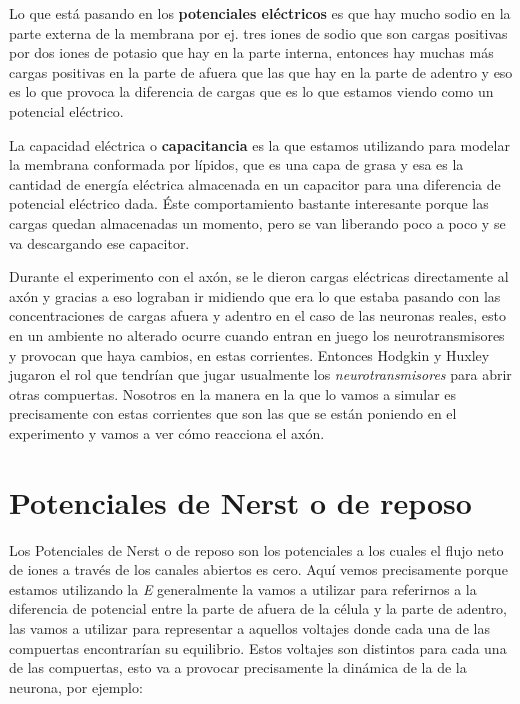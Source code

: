 Lo que está pasando en los \textbf{potenciales eléctricos} es que hay mucho sodio en la parte externa de la membrana por ej. tres iones de sodio que son cargas positivas por dos iones de potasio que hay en la parte interna, entonces hay muchas más cargas positivas en la parte de afuera que las que hay en la parte de adentro y eso es lo que provoca la diferencia de cargas que es lo que estamos viendo como un potencial eléctrico.


La capacidad eléctrica o \textbf{capacitancia} es la que estamos utilizando para modelar la membrana conformada por lípidos, que es una capa de grasa y esa es la cantidad de energía eléctrica almacenada en un capacitor para una diferencia de potencial eléctrico dada. Éste comportamiento bastante interesante porque las cargas quedan almacenadas un momento, pero se van liberando poco a poco y se va descargando ese capacitor. 


Durante el experimento con el axón, se le dieron cargas eléctricas directamente al axón y gracias a eso lograban ir midiendo que era lo que estaba pasando con las concentraciones de cargas afuera y adentro en el caso de las neuronas reales, esto en un ambiente no alterado ocurre cuando entran en juego los neurotransmisores y provocan que haya cambios, en estas corrientes. Entonces Hodgkin y Huxley jugaron el rol que tendrían que jugar usualmente los \emph{neurotransmisores} para abrir otras compuertas. Nosotros en la manera en la que lo vamos a simular es precisamente con estas corrientes que son las que se están poniendo en el experimento y vamos a ver cómo reacciona el axón. 

\section{Potenciales de Nerst o de reposo}

Los Potenciales de Nerst o de reposo son los potenciales a los cuales el flujo neto de iones a través de los canales abiertos es cero.
Aquí vemos precisamente porque estamos utilizando la \emph{E} generalmente la vamos a utilizar para referirnos a la diferencia de potencial entre la parte de afuera de la célula y la parte de adentro, las vamos a utilizar para representar a aquellos voltajes donde cada una de las compuertas encontrarían su equilibrio. Estos voltajes son distintos para cada una de las compuertas, esto va a provocar precisamente la dinámica de la de la neurona, por ejemplo: 

